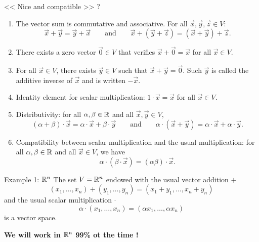 \documentclass{beamer}
\begin{document}
\begin{frame}{<< Nice and compatible >> ?}
	\vspace{-0.6cm}
	{\small
		\begin{enumerate}
			\item The vector sum is commutative and associative. For all $\vec{x},\vec{y},\vec{z} \in V$:
				$$
				\vec{x}+\vec{y} = \vec{y} + \vec{x} \qquad \text{and} \qquad \vec{x} + (\vec{y} + \vec{z}) = (\vec{x}+\vec{y}) + \vec{z}.
				$$
			\item There exists a zero vector $\vec{0} \in V$ that verifies $\vec{x} + \vec{0} = \vec{x}$ for all $\vec{x} \in V$.
			\item For all $\vec{x} \in V$, there exists $\vec{y} \in V$ such that $\vec{x} + \vec{y} = \vec{0}$. Such $\vec{y}$ is called the additive inverse of $\vec{x}$ and is written $- \vec{x}$.
			\item Identity element for scalar multiplication: $1 \cdot \vec{x} = \vec{x}$ for all $\vec{x} \in V$.
			\item Distributivity: for all $\alpha,\beta \in \mathbb{R}$ and all $\vec{x},\vec{y} \in V$,
				$$
				(\alpha + \beta) \cdot \vec{x} = \alpha \cdot \vec{x} + \beta \cdot \vec{y}
				\qquad \text{and} \qquad
				\alpha \cdot (\vec{x} + \vec{y}) = \alpha \cdot \vec{x} + \alpha \cdot \vec{y}.
				$$
			\item Compatibility between scalar multiplication and the usual multiplication: for all $\alpha,\beta \in \mathbb{R}$ and all $\vec{x} \in V$, we have
				$$
				\alpha \cdot(\beta \cdot \vec{x}) = (\alpha \beta) \cdot \vec{x}.
				$$
		\end{enumerate}
	}
\end{frame}

\begin{frame}{Example 1: $\mathbb{R}^n$}
	The set $V = \mathbb{R}^n$ endowed with the usual vector addition $+$
	$$
	(x_1, \dots, x_n) + (y_1, \dots, y_n) = (x_1 + y_1, \dots, x_n + y_n)
	$$
	and the usual scalar multiplication $\cdot$
	$$
	\alpha \cdot (x_1, \dots, x_n)= (\alpha x_1, \dots, \alpha x_n)
	$$
	is a vector space.

	\vspace{0.4cm}
	\begin{center}
		\textbf{We will work in $\mathbb{R}^n$ 99\% ot the time !}
	\end{center}

\end{frame}
\end{document}
